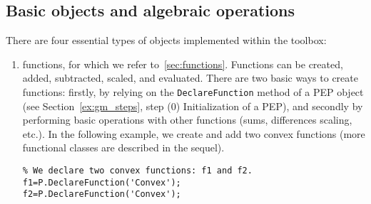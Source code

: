 \documentclass[11pt,a4paper]{article}
\begin{document}
\subsection{Basic objects and algebraic operations}\label{sec:basicobjects}
There are four essential types of objects implemented within the toolbox:
\begin{enumerate}
\item functions, for which we refer to~\ref{sec:functions}. Functions can be created, added, subtracted, scaled, and evaluated. There are two basic ways to create functions: firstly, by relying on the \verb?DeclareFunction? method of a PEP object (see Section~\ref{ex:gm_steps}, step (0) Initialization of a PEP), and secondly by performing basic operations with other functions (sums, differences scaling, etc.). In the following example, we create and add two convex functions (more functional classes are described in the sequel).\\[-1cm]
\begin{lstlisting}
% We declare two convex functions: f1 and f2.
f1=P.DeclareFunction('Convex'); 
f2=P.DeclareFunction('Convex');


\end{lstlisting}
\end{enumerate}
\end{document}
